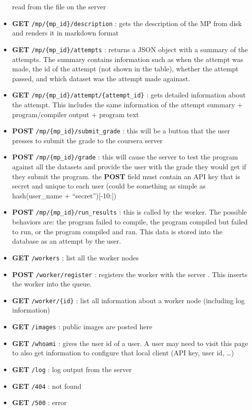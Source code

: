 \begin{itemize}
  read from the file on the server
\item
  \textbf{GET} \texttt{/mp/\{mp\_id\}/description} : gets the
  description of the MP from disk and renders it in markdown format
\item
  \textbf{GET} \texttt{/mp/\{mp\_id\}/attempts} : returns a JSON object
  with a summary of the attempts. The summary contains information such
  as when the attempt was made, the id of the attempt (not shown in the
  table), whether the attempt passed, and which dataset was the attempt
  made againast.
\item
  \textbf{GET} \texttt{/mp/\{mp\_id\}/attempt/\{attempt\_id\}} : gets
  detailed information about the attempt. This includes the same
  information of the attempt summary + program/compiler output + program
  text
\item
  \textbf{POST} \texttt{/mp/\{mp\_id\}/submit\_grade} : this will be a
  button that the user presses to submit the grade to the coursera
  server
\item
  \textbf{POST} \texttt{/mp/\{mp\_id\}/grade} : this will cause the
  server to test the program against all the datasets and provide the
  user with the grade they would get if they submit the program. the
  \textbf{POST} field must contain an API key that is secret and unique
  to each user (could be something as simple as hash(user\_name +
  ``secret''){[}-10:{]})
\item
  \textbf{POST} \texttt{/mp/\{mp\_id\}/run\_results} : this is called by
  the worker. The possible behaviors are: the program failed to compile,
  the program compiled but failed to run, or the program compiled and
  ran. This data is stored into the database as an attempt by the user.
\item
  \textbf{GET} \texttt{/workers} : list all the worker nodes
\item
  \textbf{POST} \texttt{/worker/register} : registers the worker with
  the server . This inserts the worker into the queue.
\item
  \textbf{GET} \texttt{/worker/\{id\}} : list all information about a
  worker node (including log information)
\item
  \textbf{GET} \texttt{/images} : public images are posted here
\item
  \textbf{GET} \texttt{/whoami} : gives the user id of a user. A user
  may need to visit this page to also get information to configure that
  local client (API key, user id, \ldots{})
\item
  \textbf{GET} \texttt{/log} : log output from the server
\item
  \textbf{GET} \texttt{/404} : not found
\item
  \textbf{GET} \texttt{/500} : error
\end{itemize}

